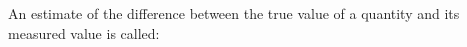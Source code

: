 An estimate of the difference between the true value of a quantity
and its measured value is called:

